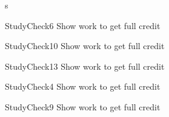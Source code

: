 \documentclass[a4paper,8pt]{book}
\begin{document}
\begin{exam}{s}
\begin{verA}
 \begin{problem*}{StudyCheck6}{ Show work to get full credit}\vspace{1cm}  
\begin{solution}[1.0in]\end{solution}
\end{problem*}
 
 \begin{problem*}{StudyCheck10}{ Show work to get full credit}\vspace{1cm}  
\begin{solution}[1.0in]\end{solution}
\end{problem*}
 
 \begin{problem*}{StudyCheck13}{ Show work to get full credit}\vspace{1cm}  
\begin{solution}[1.0in]\end{solution}
\end{problem*}
 
  \begin{problem*}{StudyCheck4}{ Show work to get full credit}\vspace{1cm}  
\begin{solution}[1.0in]\end{solution}
\end{problem*}
 
   \begin{problem*}{StudyCheck9}{ Show work to get full credit}\vspace{1cm}  
\begin{solution}[1.0in]\end{solution}
\end{problem*}
 
 
 
 
 
 
 



\end{verA}
\end{exam}
\end{document}
